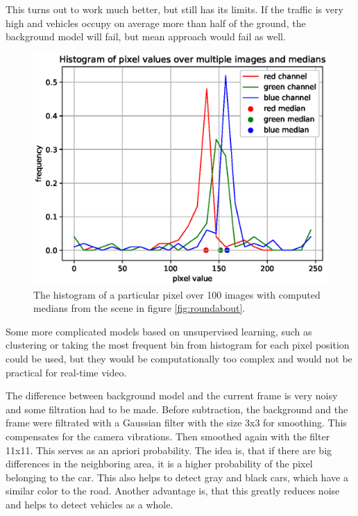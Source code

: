 \documentclass[a4paper,11pt,titlepage,twoside]{article}
\numberwithin{figure}{section}
\begin{document}
This turns out to work much better, but still has its limits. If the traffic is very high and vehicles occupy on average more than half of the ground, the background model will fail, but mean approach would fail as well. 

\begin{figure}[h]
\centering
\includegraphics[width=1\linewidth]{fig/pixel_hist.eps}
\caption{The histogram of a particular pixel over 100 images with computed medians from the scene in figure \ref{fig:roundabout}.}
\label{fig:pixel_hist}
\end{figure}

Some more complicated models based on unsupervised learning, such as clustering or taking the most frequent bin from histogram for each pixel position could be used, but they would be computationally too complex and would not be practical for real-time video.

The difference between background model and the current frame is very noisy and some filtration had to be made. Before subtraction, the background and the frame were filtrated with a Gaussian filter with the size 3x3 for smoothing. This compensates for the camera vibrations. Then smoothed again with the filter 11x11. This serves as an apriori probability. The idea is, that if there are big differences in the neighboring area, it is a higher probability of the pixel belonging to the car. This also helps to detect gray and black cars, which have a similar color to the road. Another advantage is, that this greatly reduces noise and helps to detect vehicles as a whole.
\end{document}
